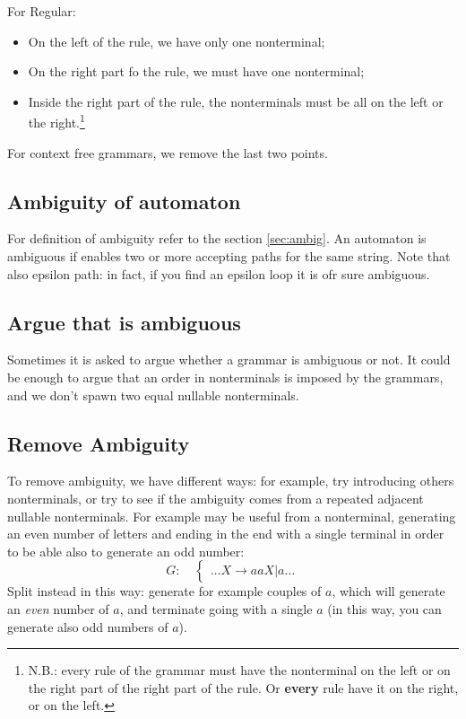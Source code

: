             For Regular:
            \begin{itemize}
                \item On the left of the rule, we have only one nonterminal;
                \item On the right part fo the rule, we must have one nonterminal;
                \item Inside the right part of the rule, the nonterminals must be all on the left or the right.\footnote{N.B.: every rule of the grammar must have 
                the nonterminal on the left or on the right part of the right part of the rule. Or \textbf{every} rule have it on the right, or on the left.}
            \end{itemize}
            For context free grammars, we remove the last two points.
        \subsection{Ambiguity of automaton}
            For definition of ambiguity refer to the section \ref{sec:ambig}.
            An automaton is ambiguous if enables two or more accepting paths for the same string. Note that also epsilon path: in fact, if you find an epsilon loop
            it is ofr sure ambiguous.
        \subsection{Argue that is ambiguous}
            Sometimes it is asked to argue whether a grammar is ambiguous or not. It could be enough to argue that an order in nonterminals is 
            imposed by the grammars, and we don't spawn two equal nullable nonterminals.%
        \subsection{Remove Ambiguity}
            To remove ambiguity, we have different ways: for example, try introducing others nonterminals, or try to see if the ambiguity 
            comes from a repeated adjacent nullable nonterminals. For example may be useful from a nonterminal, generating an even number of letters and ending 
            in the end with a single terminal in order to be able also to generate an odd number:
            $$
                G:\quad\begin{cases}
                    \ldots
                    X\rightarrow aaX\vert a
                    \ldots
                \end{cases}
            $$
            Split instead in this way: generate for example couples of $a$, which will generate an \emph{even} number of $a$, and terminate going with a single $a$
            (in this way, you can generate also odd numbers of $a$).


